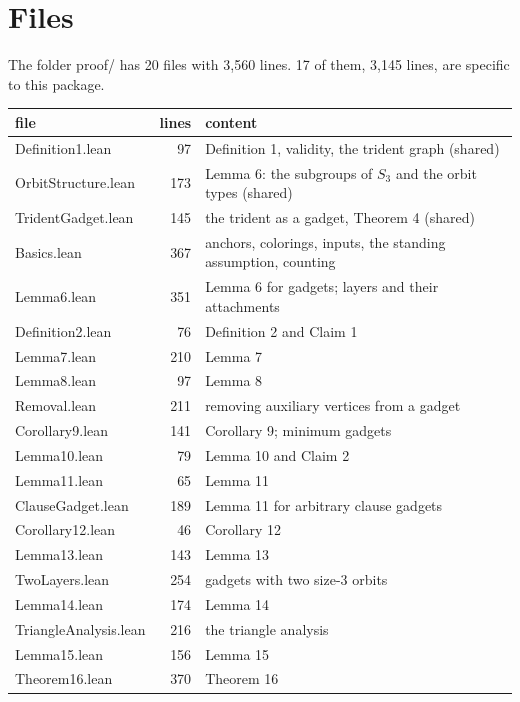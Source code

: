 \documentclass[11pt,a4paper]{article}
\newcommand{\leanus}{\textunderscore\allowbreak}
\newcommand{\lean}[1]{{\ttfamily\let\_\leanus #1}}
\begin{document}
\section{Files}\label{sec:files}

The folder \lean{proof/} has 20 files with 3,560 lines.
17 of them, 3,145 lines, are specific to this package.

\begin{center}
\begin{tabular}{@{}lrl@{}}
\toprule
file & lines & content\\
\midrule
\lean{Definition1.lean} & 97 & Definition 1, validity, the trident graph (shared)\\
\lean{OrbitStructure.lean} & 173 & Lemma 6: the subgroups of $S_3$ and the orbit types (shared)\\
\lean{TridentGadget.lean} & 145 & the trident as a gadget, Theorem 4 (shared)\\
\lean{Basics.lean} & 367 & anchors, colorings, inputs, the standing assumption, counting\\
\lean{Lemma6.lean} & 351 & Lemma 6 for gadgets; layers and their attachments\\
\lean{Definition2.lean} & 76 & Definition 2 and Claim 1\\
\lean{Lemma7.lean} & 210 & Lemma 7\\
\lean{Lemma8.lean} & 97 & Lemma 8\\
\lean{Removal.lean} & 211 & removing auxiliary vertices from a gadget\\
\lean{Corollary9.lean} & 141 & Corollary 9; minimum gadgets\\
\lean{Lemma10.lean} & 79 & Lemma 10 and Claim 2\\
\lean{Lemma11.lean} & 65 & Lemma 11\\
\lean{ClauseGadget.lean} & 189 & Lemma 11 for arbitrary clause gadgets\\
\lean{Corollary12.lean} & 46 & Corollary 12\\
\lean{Lemma13.lean} & 143 & Lemma 13\\
\lean{TwoLayers.lean} & 254 & gadgets with two size-3 orbits\\
\lean{Lemma14.lean} & 174 & Lemma 14\\
\lean{TriangleAnalysis.lean} & 216 & the triangle analysis\\
\lean{Lemma15.lean} & 156 & Lemma 15\\
\lean{Theorem16.lean} & 370 & Theorem 16\\
\bottomrule
\end{tabular}
\end{center}
\end{document}
